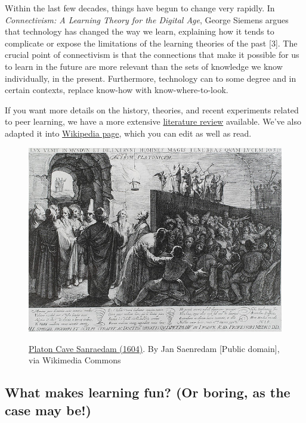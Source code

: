 Within the last few decades, things have begun to change very rapidly.
In \emph{Connectivism: A Learning Theory for the Digital Age}, George
Siemens argues that technology has changed the way we learn, explaining
how it tends to complicate or expose the limitations of the learning
theories of the past {[}3{]}. The crucial point of connectivism is that
the connections that make it possible for us to learn in the future are
more relevant than the sets of knowledge we know individually, in the
present. Furthermore, technology can to some degree and in certain
contexts, replace know-how with know-where-to-look.

If you want more details on the history, theories, and recent
experiments related to peer learning, we have a more extensive
\href{http://peeragogy.org/resources/literature-review-peeragogy/}{literature
review} available. We've also adapted it into
\href{http://en.wikipedia.org/wiki/Peer\_learning}{Wikipedia page},
which you can edit as well as read.

\begin{figure}
\href{http://commons.wikimedia.org/wiki/File:Platon\_Cave\_Sanraedam\_1604.jpg}{\includegraphics[width=\textwidth]{../pictures/plato_cave.jpg}}
 \caption{\href{http://commons.wikimedia.org/w/index.php?title=File:Platon\_Cave\_Sanraedam\_1604.jpg\&oldid=68567627}{Platon Cave Sanraedam (1604)}. By Jan Saenredam {[}Public domain{]}, via
 Wikimedia Commons}
\end{figure}

\subsection{What makes learning fun? (Or boring, as the case may be!)}

